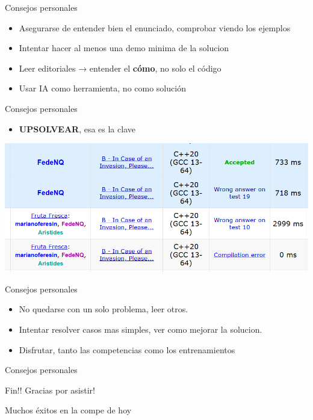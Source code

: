\documentclass{beamer}
\begin{document}
\begin{frame}[fragile]{Consejos personales}
  \begin{itemize}
  
  \item Asegurarse de entender bien el enunciado, comprobar viendo los ejemplos
  \item Intentar hacer al menos una demo minima de la solucion
  \item Leer editoriales → entender el \textbf{cómo}, no solo el código
  \item Usar IA como herramienta, no como solución

  \end{itemize}
\end{frame}



\begin{frame}[fragile]{Consejos personales}
  \begin{itemize}
  \item \textbf{UPSOLVEAR}, esa es la clave
  \end{itemize}
  \includegraphics[width=1\textwidth,keepaspectratio]{fotos/uplsoving.png}
  
\end{frame}


\begin{frame}[fragile]{Consejos personales}
  \begin{itemize}
  \item No quedarse con un solo problema, leer otros.
  \item Intentar resolver casos mas simples, ver como mejorar la solucion.
  \item Disfrutar, tanto las competencias como los entrenamientos
  \end{itemize}
  
\end{frame}

\begin{frame}[fragile]{Consejos personales}

  Fin!!
  Gracias por asistir! 

  Muchos éxitos en la compe de hoy
  
\end{frame}
\end{document}
